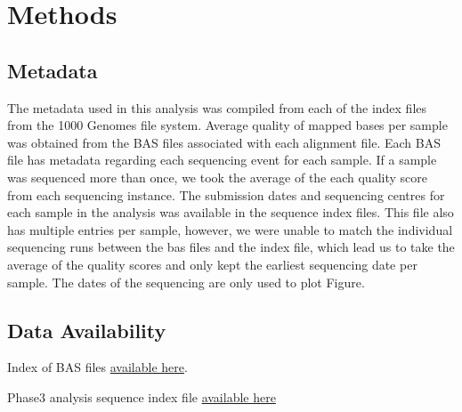 \documentclass[9pt,lineno]{elife}
\begin{document}




\section{Methods}
\subsection{Metadata}
The metadata used in this analysis was compiled from each of the index files from the 1000 Genomes file system. 
Average quality of mapped bases per sample was obtained from the BAS files associated with each alignment file. 
Each BAS file has metadata regarding each sequencing event for each sample. 
If a sample was sequenced more than once, we took the average of the each quality score from each sequencing instance. 
The submission dates and sequencing centres for each sample in the analysis was available in the sequence index files.  
This file also has multiple entries per sample, however, we were unable to match the individual sequencing runs between the bas files and the index file, which lead us to take the average of the quality scores and only kept the earliest sequencing date per sample. 
The dates of the sequencing are only used to plot Figure.

\subsection{Data Availability}

Index of BAS files \href{http://ftp.1000genomes.ebi.ac.uk/vol1/ftp/data_collections/1000_genomes_project/1000genomes.low_coverage.GRCh38DH.alignment.index}{available here}.

Phase3 analysis sequence index file  \href{http://ftp.1000genomes.ebi.ac.uk/vol1/ftp/phase3/20130502.phase3.analysis.sequence.index}{available here} 
\end{document}
